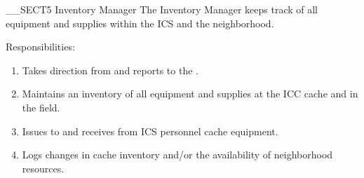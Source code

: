 __SECT5{ Inventory Manager
\label{sec:InventoryManager } }
The Inventory Manager keeps track of all equipment and supplies
within the ICS and the neighborhood.

Responsibilities:
\begin{enumerate}
\item Takes direction from and reports to the \EquipmentManager.
\item Maintains an inventory of all equipment and supplies at the ICC cache and in the field.
\item Issues to and receives from ICS personnel cache equipment.
\item Logs changes in cache inventory and/or the availability of neighborhood resources.
\end{enumerate}

